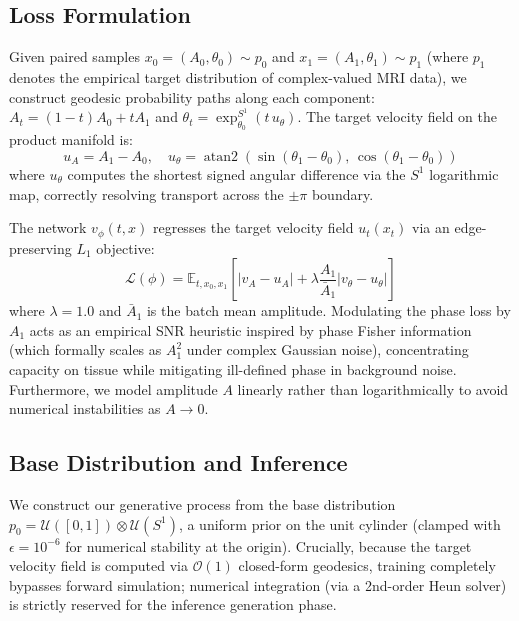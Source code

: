 \subsection{Loss Formulation}
Given paired samples $x_0 = (A_0, \theta_0) \sim p_0$ and $x_1 = (A_1, \theta_1) \sim p_1$ (where $p_1$ denotes the empirical target distribution of complex-valued MRI data), we construct geodesic probability paths along each component: $A_t = (1-t)A_0 + t A_1$ and $\theta_t = \exp_{\theta_0}^{S^1}(t\, u_\theta)$. The target velocity field on the product manifold is:
\begin{equation}
    u_A = A_1 - A_0, \quad u_\theta = \operatorname{atan2}(\sin(\theta_1 - \theta_0),\, \cos(\theta_1 - \theta_0))
\end{equation}
where $u_\theta$ computes the shortest signed angular difference via the $S^1$ logarithmic map, correctly resolving transport across the $\pm\pi$ boundary.

The network $v_\phi(t, x)$ regresses the target velocity field $u_t(x_t)$ via an edge-preserving $L_1$ objective:
\begin{equation}
    \mathcal{L}(\phi) = \mathbb{E}_{t, x_0, x_1} \left[ |v_A - u_A| + \lambda \frac{A_1}{\bar{A}_1} |v_\theta - u_\theta| \right]
\end{equation}
where $\lambda = 1.0$ and $\bar{A}_1$ is the batch mean amplitude. Modulating the phase loss by $A_1$ acts as an empirical SNR heuristic inspired by phase Fisher information (which formally scales as $A_1^2$ under complex Gaussian noise), concentrating capacity on tissue while mitigating ill-defined phase in background noise. Furthermore, we model amplitude $A$ linearly rather than logarithmically to avoid numerical instabilities as $A \to 0$.

\subsection{Base Distribution and Inference}
We construct our generative process from the base distribution $p_0 = \mathcal{U}([0,1]) \otimes \mathcal{U}(S^1)$, a uniform prior on the unit cylinder (clamped with $\epsilon = 10^{-6}$ for numerical stability at the origin). Crucially, because the target velocity field is computed via $\mathcal{O}(1)$ closed-form geodesics, training completely bypasses forward simulation; numerical integration (via a 2nd-order Heun solver) is strictly reserved for the inference generation phase.
